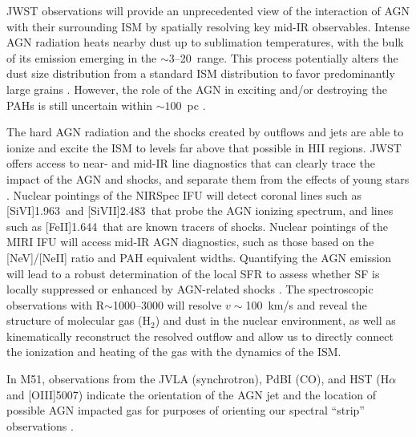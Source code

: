 \documentclass[12pt]{article}
\begin{document}

\vspace{0.05in}

JWST observations will provide an unprecedented view of the interaction of AGN with their surrounding ISM by spatially resolving key mid-IR observables. Intense AGN radiation heats nearby dust up to sublimation temperatures, with the bulk of its emission emerging in the $\sim$3--20\micron\ range. This process potentially alters the dust size distribution from a standard ISM distribution to favor predominantly large grains  \citep[e.g.,][]{kishimoto2007,honig2017}. However, the role of the AGN in exciting and/or destroying the PAHs is still uncertain within $\sim100$~pc \citep{smith2007,jensen2017}.

The hard AGN radiation and the shocks created by outflows and jets are able to ionize and excite the ISM to levels far above that possible in H{\small II} regions.  JWST offers access to near- and mid-IR line diagnostics that can clearly trace the impact of the AGN  and shocks, and separate them from the effects of young stars  \citep{dale2004,dale2009,scharwachter2013,colina2015,smajic2015}. Nuclear pointings of the NIRSpec IFU will detect coronal lines such as [Si{\small VI}]1.963\micron\ and [Si{\small VII}]2.483\micron\ that probe the AGN ionizing spectrum, and lines such as [Fe{\small II}]1.644\micron\ that are known tracers of shocks.  Nuclear pointings of the MIRI IFU will access mid-IR AGN diagnostics, such as those based on the [Ne{\small V}]/[Ne{\small II}] ratio and PAH equivalent widths. Quantifying the AGN emission will lead to a robust determination of the local SFR to assess whether SF is locally suppressed or enhanced by AGN-related shocks  \citep{silk2013}. The spectroscopic observations with R$\sim$1000--3000 will resolve $v \sim$100~km/s and reveal the structure of molecular gas (H$_2$) and dust in the nuclear environment, as well as kinematically reconstruct the resolved outflow and allow us to directly connect the ionization and heating of the gas with the dynamics of the ISM.

In M51, observations from the JVLA (synchrotron), PdBI (CO), and HST (H$\alpha$ and [O{\small III}]5007) indicate the orientation of the AGN jet and the location of possible AGN impacted gas for purposes of orienting our spectral ``strip'' observations \citep{querejeta2016}.  
\end{document}

